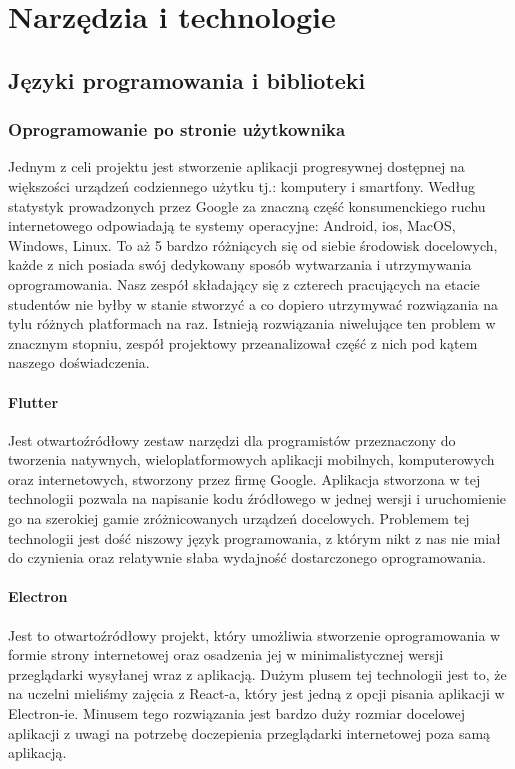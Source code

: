
\section{Narzędzia i technologie}
\label{sec:narzedzia-i-technologie}

\subsection{Języki programowania i biblioteki}
\label{subsec:jezyki-programowania-i-biblioteki}

\subsubsection{Oprogramowanie po stronie użytkownika}
Jednym z celi projektu jest stworzenie aplikacji progresywnej dostępnej na większości urządzeń codziennego użytku tj.: komputery i smartfony.
Według statystyk prowadzonych przez Google za znaczną część konsumenckiego ruchu internetowego odpowiadają te systemy operacyjne: Android, ios, MacOS, Windows, Linux.
To aż 5 bardzo różniących się od siebie środowisk docelowych, każde z nich posiada swój dedykowany sposób wytwarzania i utrzymywania oprogramowania.
Nasz zespół składający się z czterech pracujących na etacie studentów nie byłby w stanie stworzyć a co dopiero utrzymywać rozwiązania na tylu różnych platformach na raz.
Istnieją rozwiązania niwelujące ten problem w znacznym stopniu, zespół projektowy przeanalizował część z nich pod kątem naszego doświadczenia.

\paragraph{Flutter}
Jest otwartoźródłowy zestaw narzędzi dla programistów przeznaczony do tworzenia natywnych, wieloplatformowych aplikacji mobilnych, komputerowych oraz internetowych, stworzony przez firmę Google.
Aplikacja stworzona w tej technologii pozwala na napisanie kodu źródłowego w jednej wersji i uruchomienie go na szerokiej gamie zróżnicowanych urządzeń docelowych.
Problemem tej technologii jest dość niszowy język programowania, z którym nikt z nas nie miał do czynienia oraz relatywnie słaba wydajność dostarczonego oprogramowania.

\paragraph{Electron}
Jest to otwartoźródłowy projekt, który umożliwia stworzenie oprogramowania w formie strony internetowej oraz osadzenia jej w minimalistycznej wersji przeglądarki wysyłanej wraz z aplikacją.
Dużym plusem tej technologii jest to, że na uczelni mieliśmy zajęcia z React-a, który jest jedną z opcji pisania aplikacji w Electron-ie.
Minusem tego rozwiązania jest bardzo duży rozmiar docelowej aplikacji z uwagi na potrzebę doczepienia przeglądarki internetowej poza samą aplikacją.

